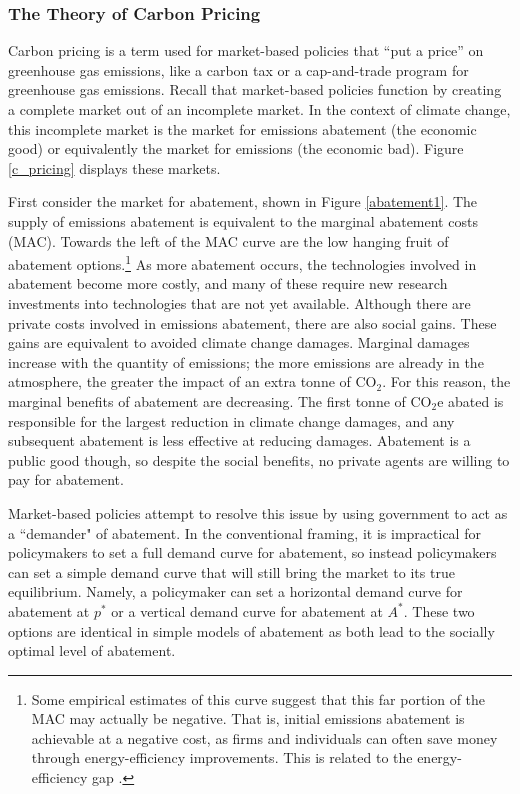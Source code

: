 \subsubsection{The Theory of Carbon Pricing}

Carbon pricing is a term used for market-based policies that ``put a price'' on greenhouse gas emissions, like a carbon tax or a cap-and-trade program for greenhouse gas emissions. Recall that market-based policies function by creating a complete market out of an incomplete market. In the context of climate change, this incomplete market is the market for emissions abatement (the economic good) or equivalently the market for emissions (the economic bad). Figure \ref{c_pricing} displays these markets. 

First consider the market for abatement, shown in Figure \ref{abatement1}. The supply of emissions abatement is equivalent to the marginal abatement costs (MAC). Towards the left of the MAC curve are the low hanging fruit of abatement options.\footnote{Some empirical estimates of this curve suggest that this far portion of the MAC may actually be negative. That is, initial emissions abatement is achievable at a negative cost, as firms and individuals can often save money through energy-efficiency improvements. This is related to the energy-efficiency gap \citep[see][]{allcott2012there, gerarden2017assessing}.} As more abatement occurs, the technologies involved in abatement become more costly, and many of these require new research investments into technologies that are not yet available. Although there are private costs involved in emissions abatement, there are also social gains. These gains are equivalent to avoided climate change damages. Marginal damages increase with the quantity of emissions; the more emissions are already in the atmosphere, the greater the impact of an extra tonne of CO$_2$. For this reason, the marginal benefits of abatement are decreasing. The first tonne of CO$_2$e abated is responsible for the largest reduction in climate change damages, and any subsequent abatement is less effective at reducing damages. Abatement is a public good though, so despite the social benefits, no private agents are willing to pay for abatement. 

Market-based policies attempt to resolve this issue by using government to act as a ``demander" of abatement. In the conventional framing, it is impractical for policymakers to set a full demand curve for abatement, so instead policymakers can set a simple demand curve that will still bring the market to its true equilibrium. Namely, a policymaker can set a horizontal demand curve for abatement at $p^*$ or a vertical demand curve for abatement at $A^*$. These two options are identical in simple models of abatement as both lead to the socially optimal level of abatement. 

